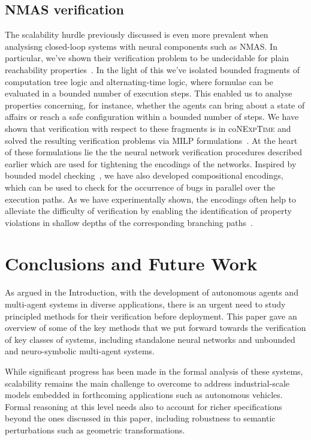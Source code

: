 \documentclass{article}
\newcommand{\conexptime}{co\nexptime}
\newcommand{\nexptime}{\textsc{NExpTime}\xspace}
\begin{document}
\subsection{NMAS verification} The scalability hurdle previously discussed is
even more prevalent when analysisng closed-loop systems with neural components
such as NMAS. In particular, we've shown their verification problem to be
undecidable for plain reachability properties~\cite{Akintunde+22}. In the light
of this we've isolated bounded fragments of computation tree logic and
alternating-time logic, where formulae can be evaluated in a bounded number of
execution steps. This enabled us to analyse properties concerning, for instance,
whether the agents can bring about a state of affairs or reach a safe
configuration within a bounded number of steps. We have shown that verification
with respect to these fragments is in \conexptime and solved the resulting
verification problems via MILP formulations~\cite{Akintunde+20,Akintunde+20b}.
At the heart of these formulations lie the the neural network verification
procedures described earlier which are used for tightening the encodings of the
networks.  Inspired by bounded model checking~\cite{Clarke+01a},  we have also
developed compositional encodings,  which can be used to check for the
occurrence of bugs in parallel over the execution paths. As we have
experimentally shown, the encodings often help to alleviate the difficulty of
verification by enabling the identification of property violations in shallow
depths of the corresponding branching paths~\cite{Akintunde+20}.






\section{Conclusions and Future Work}

As argued in the Introduction, with the development of autonomous agents and
multi-agent systems in diverse applications, there is an urgent need to study
principled methods for their verification before deployment. This paper gave an
overview of some of the key methods that we put forward towards the verification
of key classes of systems, including standalone neural networks and unbounded
and neuro-symbolic multi-agent systems. 

While significant progress has been made in the formal analysis of these
systems, scalability remains the main challenge to overcome to address
industrial-scale models embedded in forthcoming applications such as autonomous
vehicles. Formal reasoning at this level needs also to account for richer
specifications beyond the ones discussed in this paper, including robustness to
semantic perturbations such as geometric transformations. 
\end{document}
